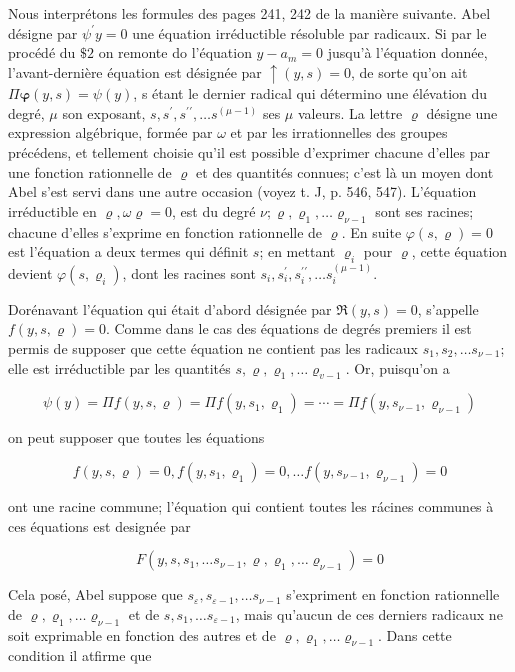 \documentclass{article}
\begin{document}
Nous interprétons les formules des pages 241, 242 de la manière suivante. Abel désigne par \(\psi^{\prime} y=0\) une équation irréductible résoluble par radicaux. Si par le procédé du \(\$ 2\) on remonte do l'équation \(y-a_{m}=0\) jusqu'à l'équation donnée, l'avant-dernière équation est désignée par \(\uparrow(y, s)=0\), de sorte qu'on ait \(\Pi \boldsymbol{\varphi}(y, s)=\psi(y)\), s étant le dernier radical qui détermino une élévation du degré, \(\mu\) son exposant, \(s, s^{\prime}, s^{\prime \prime}, \ldots s^{(\mu-1)}\) ses \(\mu\) valeurs. La lettre \(\varrho\) désigne une expression algébrique, formée par \(\omega\) et par les irrationnelles des groupes précédens, et tellement choisie qu'il est possible d'exprimer chacune d'elles par une fonction rationnelle de \(\varrho\) et des quantités connues; c'est là un moyen dont Abel s'est servi dans une autre occasion (voyez t. J, p. 546, 547). L'équation irréductible en \(\varrho, \omega \varrho=0\), est du degré \(\nu ; \varrho, \varrho_{1}, \ldots \varrho_{\nu-1}\) sont ses racines; chacune d'elles s'exprime en fonction rationnelle de \(\varrho\). En suite \(\varphi(s, \varrho)=0\) est l'équation a deux termes qui définit \(s\); en mettant \(\varrho_{i}\) pour \(\varrho\), cette équation devient \(\varphi\left(s, \varrho_{i}\right)\), dont les racines sont \(s_{i}, s_{i}^{\prime}, s_{i}^{\prime \prime}, \ldots s_{i}^{(\mu-1)}\).

Dorénavant l'équation qui était d'abord désignée par \(\Re(y, s)=0\), s'appelle \(f(y, s, \varrho)=0\). Comme dans le cas des équations de degrés premiers il est permis de supposer que cette équation ne contient pas les radicaux \(s_{1}, s_{2}, \ldots s_{\nu-1}\); elle est irréductible par les quantités \(s, \varrho, \varrho_{1}, \ldots \varrho_{v-1}\). Or, puisqu'on a

\[
\psi(y)=\Pi f(y, s, \varrho)=\Pi f\left(y, s_{1}, \varrho_{1}\right)=\cdots=\Pi f\left(y, s_{\nu-1}, \varrho_{\nu-1}\right)
\]

on peut supposer que toutes les équations

\[
f(y, s, \varrho)=0, f\left(y, s_{1}, \varrho_{1}\right)=0, \ldots f\left(y, s_{\nu-1}, \varrho_{\nu-1}\right)=0
\]

ont une racine commune; l'équation qui contient toutes les rácines communes à ces équations est designée par

\[
F\left(y, s, s_{1}, \ldots s_{\nu-1}, \varrho, \varrho_{1}, \ldots \varrho_{\nu-1}\right)=0
\]

Cela posé, Abel suppose que \(s_{\varepsilon}, s_{\varepsilon-1}, \ldots s_{\nu-1}\) s'expriment en fonction rationnelle de \(\varrho, \varrho_{1}, \ldots \varrho_{\nu-1}\) et de \(s, s_{1}, \ldots s_{\varepsilon-1}\), mais qu'aucun de ces derniers radicaux ne soit exprimable en fonction des autres et de \(\varrho, \varrho_{1}, \ldots \varrho_{\nu-1}\). Dans cette condition il atfirme que
\end{document}

